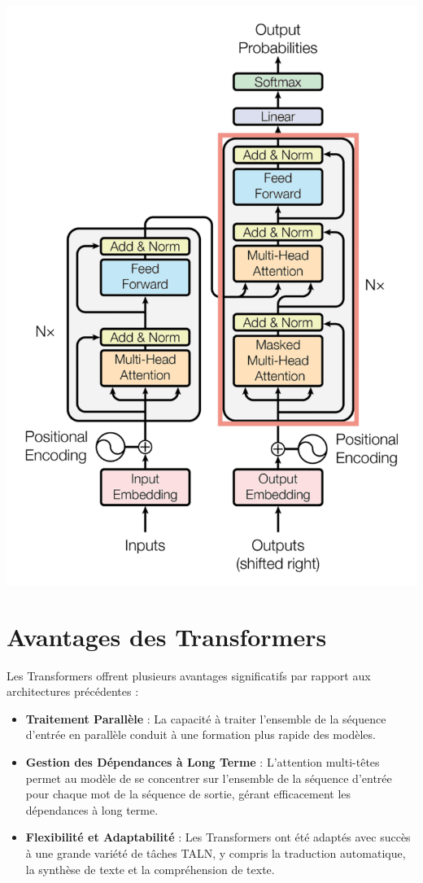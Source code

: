 \documentclass[
  letterpaper,
  DIV=11,
  numbers=noendperiod]{scrreprt}
\providecommand{\tightlist}{%
  \setlength{\itemsep}{0pt}\setlength{\parskip}{0pt}}\usepackage{longtable,booktabs,array}
\begin{document}
\begin{itemize}
  \includegraphics{images/transformer_2-768x1082.png}
\end{itemize}

\section{Avantages des Transformers}\label{avantages-des-transformers}

Les Transformers offrent plusieurs avantages significatifs par rapport
aux architectures précédentes :

\begin{itemize}
\tightlist
\item
  \textbf{Traitement Parallèle} : La capacité à traiter l'ensemble de la
  séquence d'entrée en parallèle conduit à une formation plus rapide des
  modèles.
\item
  \textbf{Gestion des Dépendances à Long Terme} : L'attention
  multi-têtes permet au modèle de se concentrer sur l'ensemble de la
  séquence d'entrée pour chaque mot de la séquence de sortie, gérant
  efficacement les dépendances à long terme.
\item
  \textbf{Flexibilité et Adaptabilité} : Les Transformers ont été
  adaptés avec succès à une grande variété de tâches TALN, y compris la
  traduction automatique, la synthèse de texte et la compréhension de
  texte.
\end{itemize}
\end{document}
